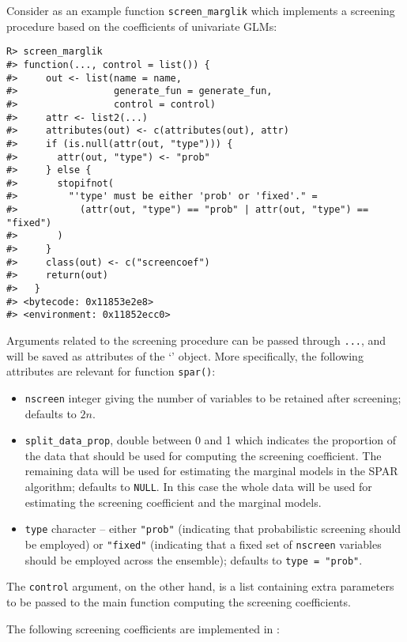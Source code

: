 \documentclass[
  article,
  nojss]{jss}
\newcommand{\class}[1]{`\code{#1}'}
\begin{document}
Consider as an example function \texttt{screen\_marglik} which
implements a screening procedure based on the coefficients of univariate
GLMs:

\begin{verbatim}
R> screen_marglik
#> function(..., control = list()) {
#>     out <- list(name = name,
#>                 generate_fun = generate_fun,
#>                 control = control)
#>     attr <- list2(...)
#>     attributes(out) <- c(attributes(out), attr)
#>     if (is.null(attr(out, "type"))) {
#>       attr(out, "type") <- "prob"
#>     } else {
#>       stopifnot(
#>         "'type' must be either 'prob' or 'fixed'." =
#>           (attr(out, "type") == "prob" | attr(out, "type") == "fixed")
#>       )
#>     }
#>     class(out) <- c("screencoef")
#>     return(out)
#>   }
#> <bytecode: 0x11853e2e8>
#> <environment: 0x11852ecc0>
\end{verbatim}

Arguments related to the screening procedure can be passed through
\texttt{...}, and will be saved as attributes of the \class{screencoef}
object. More specifically, the following attributes are relevant for
function \texttt{spar()}:

\begin{itemize}
\item
  \texttt{nscreen} integer giving the number of variables to be retained
  after screening; defaults to \(2n\).
\item
  \texttt{split\_data\_prop}, double between 0 and 1 which indicates the
  proportion of the data that should be used for computing the screening
  coefficient. The remaining data will be used for estimating the
  marginal models in the SPAR algorithm; defaults to \texttt{NULL}. In
  this case the whole data will be used for estimating the screening
  coefficient and the marginal models.
\item
  \texttt{type} character -- either \texttt{"prob"} (indicating that
  probabilistic screening should be employed) or \texttt{"fixed"}
  (indicating that a fixed set of \texttt{nscreen} variables should be
  employed across the ensemble); defaults to \texttt{type\ =\ "prob"}.
\end{itemize}

The \texttt{control} argument, on the other hand, is a list containing
extra parameters to be passed to the main function computing the
screening coefficients.

The following screening coefficients are implemented in :
\end{document}
